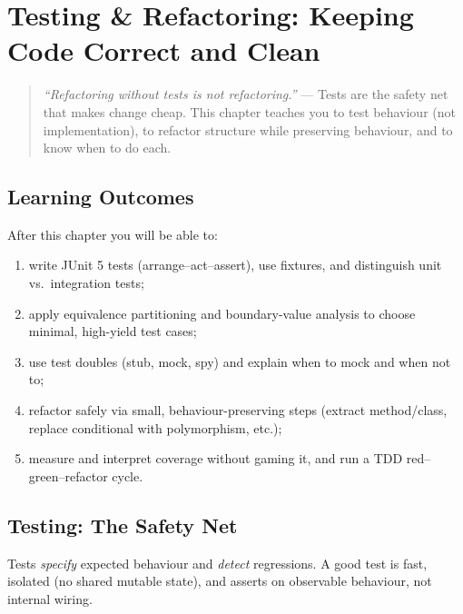 \chapter{Testing \& Refactoring: Keeping Code Correct and Clean}
\label{ch:testing}

\begin{quote}
\emph{``Refactoring without tests is not refactoring.''} --- Tests are the safety net that makes change cheap. This chapter teaches you to test behaviour (not implementation), to refactor structure while preserving behaviour, and to know when to do each.
\end{quote}

\noindent{}
\vspace{0.4em}

\section*{Learning Outcomes}
After this chapter you will be able to:
\begin{enumerate}[label=(L\arabic*)]
    \item write JUnit 5 tests (arrange--act--assert), use fixtures, and distinguish unit vs.\ integration tests;
    \item apply equivalence partitioning and boundary-value analysis to choose minimal, high-yield test cases;
    \item use test doubles (stub, mock, spy) and explain when to mock and when not to;
    \item refactor safely via small, behaviour-preserving steps (extract method/class, replace conditional with polymorphism, etc.);
    \item measure and interpret coverage without gaming it, and run a TDD red--green--refactor cycle.
\end{enumerate}

\section{Testing: The Safety Net}
\label{sec:testing}
Tests \emph{specify} expected behaviour and \emph{detect} regressions. A good test is fast, isolated (no shared mutable state), and asserts on observable behaviour, not internal wiring.

